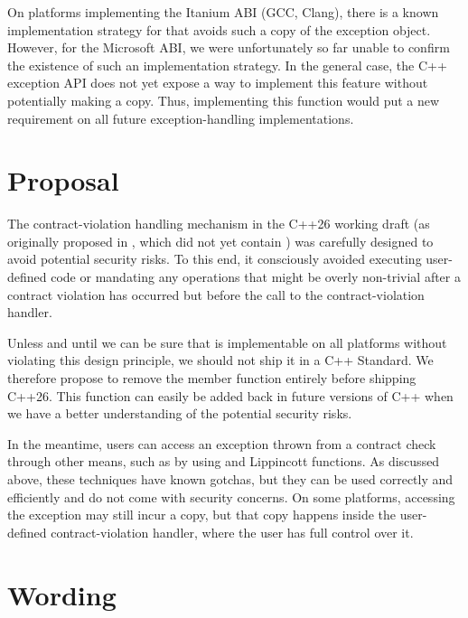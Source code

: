 On platforms implementing the Itanium ABI (GCC, Clang), there is a known implementation strategy for    that avoids such a copy of the exception object. However, for the Microsoft ABI, we were unfortunately so far unable to confirm the existence of such an implementation strategy. In the general case, the C++ exception API does not yet expose a way to implement this feature without potentially making a copy. Thus, implementing this function would put a new requirement on all future exception-handling implementations.

\section{Proposal}

The contract-violation handling mechanism in the C++26 working draft (as originally proposed in \cite{P2811R7}, which did not yet contain ) was carefully designed to avoid potential security risks. To this end, it consciously avoided executing user-defined code or mandating any operations that might be overly non-trivial after a contract violation has occurred but before the call to the contract-violation handler.

Unless and until we can be sure that  is implementable on all platforms without violating this design principle, we should not ship it in a C++ Standard. We therefore propose to remove the member function  entirely before shipping C++26. This function can easily be added back in future versions of C++ when we have a better understanding of the potential security risks.

In the meantime, users can access an exception thrown from a contract check through other means, such as by using  and Lippincott functions. As discussed above, these techniques have known gotchas, but they can be used correctly and efficiently and do not come with security concerns. On some platforms, accessing the exception may still incur a copy, but that copy happens inside the user-defined contract-violation handler, where the user has full control over it.

\section{Wording}


